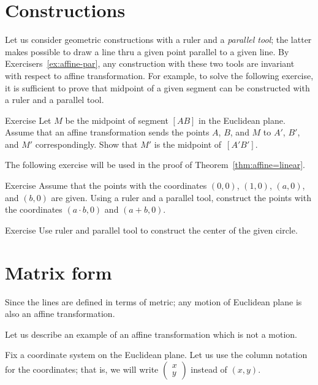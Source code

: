 \section*{Constructions}

Let us consider geometric constructions with a ruler and a \emph{parallel tool};
the latter makes possible to draw a line thru a given point parallel to a given line.
By Exercisers~\ref{ex:affine-par}, any construction with these two tools are invariant with respect to affine transformation.
For example, 
to solve the following exercise,
it is sufficient to prove that midpoint of a given segment can be constructed with a ruler and a parallel tool.

\begin{thm}{Exercise}\label{ex:midpoint-affine}
Let $M$ be the midpoint of segment $[AB]$ in the Euclidean plane.
Assume that an affine transformation sends the points $A$, $B$, and $M$
to $A'$, $B'$, and $M'$ correspondingly.
Show that $M'$ is the midpoint of~$[A'B']$.
\end{thm}

The following exercise will be used in the proof of Theorem~\ref{thm:affine=linear}.

\begin{thm}{Exercise}\label{ex:R-hom}
Assume that the points with the coordinates $(0,0)$, $(1,0)$, $(a,0)$, and $(b,0)$ are given.
Using a ruler and a parallel tool, construct the points with the coordinates $(a\cdot b,0)$ and $(a+b,0)$.
\end{thm}

\begin{thm}{Exercise}\label{ex:center-circ-affine}
Use ruler and parallel tool to construct the center of the given circle.
\end{thm}

\section*{Matrix form}

Since the lines are defined in terms of metric;
any motion of Euclidean plane is also an affine transformation.

Let us describe an example of an affine transformation which is not a motion.

Fix a coordinate system on the Euclidean plane.
Let us use the column notation for the coordinates;
that is, we will write $\left(\begin{smallmatrix}
x\\y
\end{smallmatrix} \right)$ instead of $(x,y)$.

